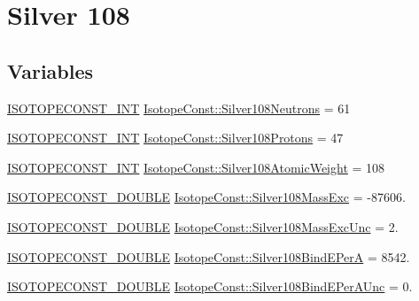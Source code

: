 \hypertarget{group___isotope_const-_silver-_ag108}{}\section{Silver 108}
\label{group___isotope_const-_silver-_ag108}
\subsection*{Variables}
\begin{DoxyCompactItemize}
\item 
\mbox{\hyperlink{group___isotope_const-_macros_ga5f18360b3e99483a35c32d789e62621c}{I\+S\+O\+T\+O\+P\+E\+C\+O\+N\+S\+T\+\_\+\+I\+NT}} \mbox{\hyperlink{group___isotope_const-_silver-_ag108_ga089d9723b69fcaab350dd37f5a89efeb}{Isotope\+Const\+::\+Silver108\+Neutrons}} = 61
\item 
\mbox{\hyperlink{group___isotope_const-_macros_ga5f18360b3e99483a35c32d789e62621c}{I\+S\+O\+T\+O\+P\+E\+C\+O\+N\+S\+T\+\_\+\+I\+NT}} \mbox{\hyperlink{group___isotope_const-_silver-_ag108_ga1419315e3654228e66b7990169c60b79}{Isotope\+Const\+::\+Silver108\+Protons}} = 47
\item 
\mbox{\hyperlink{group___isotope_const-_macros_ga5f18360b3e99483a35c32d789e62621c}{I\+S\+O\+T\+O\+P\+E\+C\+O\+N\+S\+T\+\_\+\+I\+NT}} \mbox{\hyperlink{group___isotope_const-_silver-_ag108_ga857616df21bf87cd5be79813cc783c84}{Isotope\+Const\+::\+Silver108\+Atomic\+Weight}} = 108
\item 
\mbox{\hyperlink{group___isotope_const-_macros_ga8f45a7272ce02c0b4c65c44636ed719a}{I\+S\+O\+T\+O\+P\+E\+C\+O\+N\+S\+T\+\_\+\+D\+O\+U\+B\+LE}} \mbox{\hyperlink{group___isotope_const-_silver-_ag108_ga39d7bab11996548a44d817f39e9b1b53}{Isotope\+Const\+::\+Silver108\+Mass\+Exc}} = -\/87606.
\item 
\mbox{\hyperlink{group___isotope_const-_macros_ga8f45a7272ce02c0b4c65c44636ed719a}{I\+S\+O\+T\+O\+P\+E\+C\+O\+N\+S\+T\+\_\+\+D\+O\+U\+B\+LE}} \mbox{\hyperlink{group___isotope_const-_silver-_ag108_ga379bd010f2428565b138229cbabd8951}{Isotope\+Const\+::\+Silver108\+Mass\+Exc\+Unc}} = 2.
\item 
\mbox{\hyperlink{group___isotope_const-_macros_ga8f45a7272ce02c0b4c65c44636ed719a}{I\+S\+O\+T\+O\+P\+E\+C\+O\+N\+S\+T\+\_\+\+D\+O\+U\+B\+LE}} \mbox{\hyperlink{group___isotope_const-_silver-_ag108_ga22711321ee28d8413ce18eb7d38a4507}{Isotope\+Const\+::\+Silver108\+Bind\+E\+PerA}} = 8542.
\item 
\mbox{\hyperlink{group___isotope_const-_macros_ga8f45a7272ce02c0b4c65c44636ed719a}{I\+S\+O\+T\+O\+P\+E\+C\+O\+N\+S\+T\+\_\+\+D\+O\+U\+B\+LE}} \mbox{\hyperlink{group___isotope_const-_silver-_ag108_gaa685ec7574ef0bb77e26ff957c31ca33}{Isotope\+Const\+::\+Silver108\+Bind\+E\+Per\+A\+Unc}} = 0.

\end{DoxyCompactItemize}
